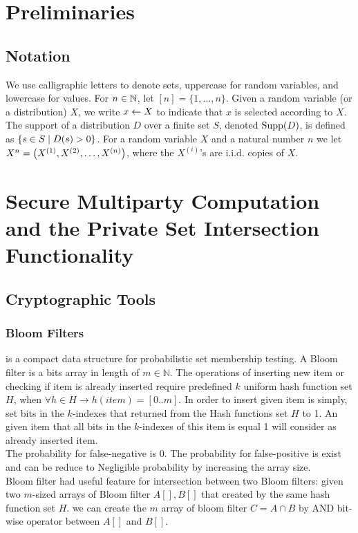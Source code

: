 
\section{Preliminaries}\label{sec:prelim}
\subsection{Notation}
We use calligraphic letters to denote sets, uppercase for random variables, and lowercase for values. 
For $n\in{\mathbb{N}}$, let $[n]=\{1,\ldots, n\}$. Given a random variable (or a distribution) $X$, we write $x\gets X$ to indicate that $x$ is selected according to $X$. The support of a distribution $D$ over a finite set $S$, denoted $\operatorname{Supp}(D)$, is defined as $\left\{s\in S\;|\; D(s)>0\right\}$. For a random variable $X$ and a natural number $n$ we let $X^n=\left ( X^{(1)},X^{(2)},\ldots,X^{(n)} \right )$, where the $X^{(i)}$'s are i.i.d. copies of $X$.


\section{Secure Multiparty Computation and the Private Set Intersection Functionality}

\subsection{Cryptographic Tools}
\subsubsection{Bloom Filters}\label{sec:bflabel}
 is a compact data structure for probabilistic set membership testing.
 A Bloom filter is a bits array in length of $m\in \mathbb{N}$. The operations of inserting new item or checking if item is already inserted require predefined $k$ uniform hash function set $H$, when  $\forall h \in H \to h(item)=[0..m]$.
In order to insert given item is simply, set bits in the $k$-indexes that returned from the Hash functions set $H$ to 1.
An given item that all bits in the $k$-indexes of this item is equal 1 will consider as already inserted item.\\
The probability for false-negative is 0.
The probability for false-positive is exist \cite{bose2008false} and can be reduce to Negligible probability by increasing the array size.\\
Bloom filter had useful feature for intersection between two Bloom filters: given two $m$-sized arrays of Bloom filter $A[],B[]$ that created by the same hash function set $H$. we can create the $m$ array of bloom filter $C = A\cap B$ by AND bit-wise operator between $A[]$ and $B[]$. 

